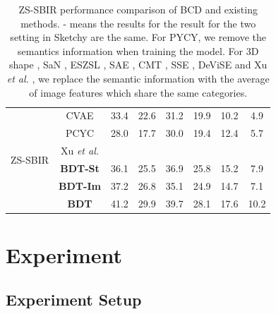\documentclass[10pt,twocolumn,letterpaper]{article}
\begin{document}
\begin{table}[!htb]
{\begin{tabular}{cccccccc}
\multirow{6}{*}{ZS-SBIR} & CVAE \cite{yelamarthi2018zero}                   & 33.4                  & 22.6               & 31.2                   & 19.9                & 10.2              & 4.9            \\
                         & PCYC \cite{dupont2018learning}                   & 28.0                  & 17.7               & 30.0                   & 19.4                & 12.4              & 5.7            \\
                         & Xu \textit{et al.} \cite{xu2019semantic}              &                       &                    &                        &                     &                   &                \\
                         & \textbf{BDT-St}            & 36.1                  & 25.5               & 36.9                   & 25.8                & 15.2              & 7.9           \\
                         & \textbf{BDT-Im}            & 37.2                  & 26.8               & 35.1                   & 24.9                & 14.7              & 7.1           \\
                         & \textbf{BDT}            & 41.2                  & 29.9               & 39.7                   & 28.1                & 17.6              & 10.2           \\ \hline \hline
\end{tabular}%
}
\caption{ZS-SBIR performance comparison of BCD and existing methods. - means the results for the result for the two setting in Sketchy are the same. For PYCY\cite{dupont2018learning}, we remove the semantics information when training the model. For 3D shape \cite{wang2015sketch}, SaN \cite{yu2017sketch}, ESZSL \cite{romera2015embarrassingly}, SAE \cite{kodirov2017semantic}, CMT \cite{socher2013zero}, SSE \cite{zhang2015bit}, DeViSE \cite{frome2013devise} and Xu \textit{et al.} \cite{xu2019semantic}, we replace the semantic information with the average of image features which share the same categories\protect\footnotemark[1].}
\label{tab:1}
\end{table}



\section{Experiment}

\subsection{Experiment Setup}
\end{document}
